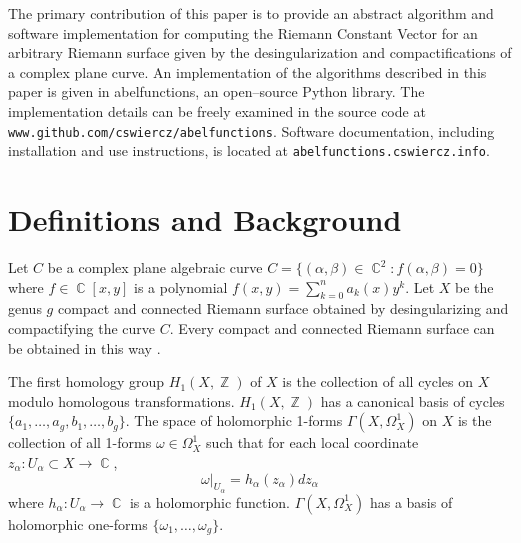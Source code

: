 \documentclass[12pt]{article}
\theoremstyle{definition}
\DeclareMathOperator{\ZZ}{\mathbb{Z}}
\DeclareMathOperator{\CC}{\mathbb{C}}
\begin{document}
The primary contribution of this paper is to provide an abstract
algorithm and software implementation for computing the Riemann Constant
Vector for an arbitrary Riemann surface given by the desingularization
and compactifications of a complex plane curve. An implementation of the
algorithms described in this paper is given in {\sc abelfunctions}, an
open--source Python library. The implementation details can be freely
examined in the source code at
\verb=www.github.com/cswiercz/abelfunctions=. Software documentation,
including installation and use instructions, is located at
\verb=abelfunctions.cswiercz.info=.




\section{Definitions and Background}\label{sec:background}



Let $C$ be a complex plane algebraic curve $C = \{(\alpha,\beta) \in
\CC^2 : f(\alpha,\beta) = 0\}$ where $f \in \CC[x,y]$ is a polynomial
$f(x,y) = \sum_{k=0}^n a_k(x) y^k$. Let $X$ be the genus $g$ compact and
connected Riemann surface obtained by desingularizing and compactifying
the curve $C$. Every compact and connected Riemann surface can be
obtained in this way \cite{Griffiths89}.

The first homology group $H_1(X,\ZZ)$ of $X$ is the collection of all
cycles on $X$ modulo homologous transformations. $H_1(X,\ZZ)$ has a
canonical basis of cycles $\{a_1,\ldots,a_g,b_1,\ldots,b_g\}$. The space
of holomorphic 1-forms $\Gamma(X,\Omega_X^1)$ on $X$ is the collection
of all 1-forms $\omega \in \Omega_X^1$ such that for each local
coordinate $z_\alpha : U_\alpha \subset X \to \CC$,
\begin{equation}
  \omega \big|_{U_\alpha}  = h_\alpha(z_\alpha) dz_\alpha
\end{equation}
where $h_\alpha : U_\alpha \to \CC$ is a holomorphic
function. $\Gamma(X,\Omega_X^1)$ has a basis of holomorphic one-forms
$\{\omega_1, \ldots, \omega_g\}$.
\end{document}
